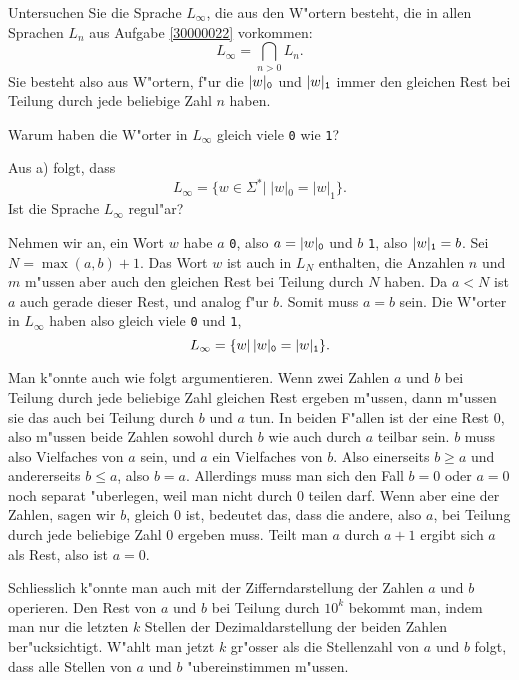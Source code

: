Untersuchen Sie die Sprache $L_\infty$, die aus den W"ortern besteht, die
in allen Sprachen $L_n$ aus Aufgabe \ref{30000022} vorkommen:
\[
L_{\infty} = \bigcap_{n>0}L_n.
\]
Sie besteht also aus W"ortern, f"ur die
$|w|_{\tt 0}$ und
$|w|_{\tt 1}$ immer den gleichen Rest bei Teilung durch jede beliebige
Zahl $n$ haben.

\begin{teilaufgaben}
\item Warum haben die W"orter in $L_\infty$ gleich viele {\tt 0}
wie {\tt 1}?
\item Aus a) folgt, dass
$$L_\infty = \{w\in\Sigma^*|\;|w|_0=|w|_1\}.$$
Ist die Sprache $L_\infty$ regul"ar?
\end{teilaufgaben}

\begin{loesung}
\begin{teilaufgaben}
\item Nehmen wir an, ein Wort $w$ habe $a$ {\tt 0}, also $a=|w|_{\tt 0}$ und
$b$ {\tt 1}, also $|w|_{\tt 1}=b$.
Sei $N=\max(a,b) + 1$. Das Wort $w$ ist auch in $L_N$ enthalten,
die Anzahlen $n$ und $m$ m"ussen aber auch den gleichen Rest bei
Teilung durch $N$ haben. Da $a<N$ ist $a$ auch gerade dieser Rest,
und analog f"ur $b$. Somit muss $a=b$ sein. Die W"orter in
$L_\infty$ haben also gleich viele {\tt 0} und {\tt 1},
\[
L_\infty=\{w|\,|w|_{\tt 0}=|w|_{\tt 1}\}.
\]

Man k"onnte auch wie folgt argumentieren. Wenn zwei Zahlen $a$ und $b$
bei Teilung durch jede beliebige Zahl gleichen Rest ergeben m"ussen,
dann m"ussen sie das auch bei Teilung durch $b$ und $a$ tun. In beiden
F"allen ist der eine Rest $0$, also m"ussen beide Zahlen sowohl durch
$b$ wie auch durch $a$ teilbar sein. $b$ muss also Vielfaches von $a$
sein, und $a$ ein Vielfaches von $b$. Also einerseits $b\ge a$ und andererseits
$b\le a$, also $b=a$. Allerdings muss man sich den Fall $b=0$ oder $a=0$
noch separat "uberlegen, weil man nicht durch $0$ teilen darf. Wenn
aber eine der Zahlen, sagen wir $b$, gleich $0$ ist, bedeutet das, dass
die andere, also $a$, bei Teilung durch jede beliebige Zahl $0$ ergeben
muss. Teilt man $a$ durch $a+1$ ergibt sich $a$ als Rest, also ist $a=0$.

Schliesslich k"onnte man auch mit der Zifferndarstellung der Zahlen
$a$ und $b$ operieren. Den Rest von $a$ und $b$ bei Teilung durch
$10^k$ bekommt man, indem man nur die letzten $k$ Stellen der
Dezimaldarstellung der beiden Zahlen ber"ucksichtigt. W"ahlt man
jetzt $k$ gr"osser als die Stellenzahl von $a$ und $b$ folgt,
dass alle Stellen von $a$ und $b$ "ubereinstimmen m"ussen.


\end{teilaufgaben}
\end{loesung}
